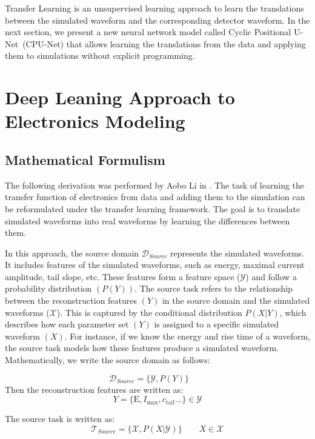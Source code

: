Transfer Learning is an unsupervised learning approach to learn the translations between the simulated waveform and the corresponding detector waveform. In the next section, we present a new neural network model called Cyclic Positional U-Net~(CPU-Net) that allows learning the translations from the data and applying them to simulations without explicit programming.

\section{Deep Leaning Approach to Electronics Modeling}
\subsection{Mathematical Formulism}
The following derivation was performed by Aobo Li in \cite{Li_2022jon}. The task of learning the transfer function of electronics from data and adding them to the simulation can be reformulated under the transfer learning framework. The goal is to translate simulated waveforms into real waveforms by learning the differences between them.

In this approach, the source domain $\mathcal{D}_{Source}$ represents the simulated waveforms. It includes features of the simulated waveforms, such as energy, maximal current amplitude, tail slope, etc. These features form a feature space ($\mathcal{Y}$) and follow a probability distribution $(P(Y))$. The source task refers to the relationship between the reconstruction features $(Y)$ in the source domain and the simulated waveforms ($\mathcal{X}$). This is captured by the conditional distribution $P(X|Y)$, which describes how each parameter set $(Y)$ is assigned to a specific simulated waveform $(X)$. For instance, if we know the energy and rise time of a waveform, the source task models how these features produce a simulated waveform. Mathematically, we write the source domain as follows:

\begin{equation}
    \mathcal{D}_{Source}=\{\mathcal{Y},P(Y)\}\qquad 
    \label{eqn:source_domain}
\end{equation}
Then the reconstruction features are written as:
 \begin{equation}
     Y=\{\mathrm{E},I_{\mathrm{max}},c_{\mathrm{tail}}...\}\in \mathcal{Y}
 \end{equation}

The source task is written as:
\begin{equation}
    \mathcal{T}_{Source}=\{\mathcal{X},P(X|\mathcal{Y})\} \qquad X\in \mathcal{X}
    \label{eqn:source_task}
\end{equation}


